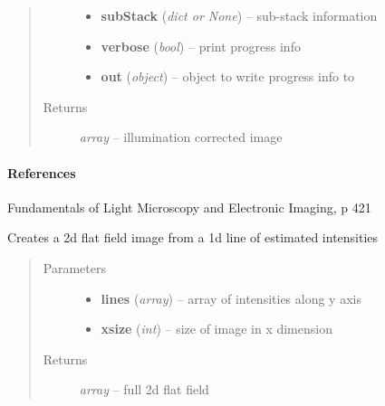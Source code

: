 \documentclass[letterpaper,10pt,english]{sphinxmanual}
\begin{document}
\begin{fulllineitems}
\begin{quote}
\begin{description}
\begin{itemize}
\item {} 
\textbf{subStack} (\emph{dict or None}) --
sub-stack information

\item {} 
\textbf{verbose} (\emph{bool}) --
print progress info

\item {} 
\textbf{out} (\emph{object}) --
object to write progress info to

\end{itemize}

\item[{Returns}] \leavevmode
\emph{array} --
illumination corrected image

\end{description}\end{quote}
\paragraph{References}

Fundamentals of Light Microscopy and Electronic Imaging, p 421




{\hyperref[api/ClearMap.ImageProcessing:ClearMap.ImageProcessing.IlluminationCorrection.DefaultFlatFieldLineFile]{\emph{}}}



\end{fulllineitems}


\begin{fulllineitems}
\label{api/ClearMap.ImageProcessing:ClearMap.ImageProcessing.IlluminationCorrection.flatfieldFromLine}
Creates a 2d flat field image from a 1d line of estimated intensities
\begin{quote}\begin{description}
\item[{Parameters}] \leavevmode\begin{itemize}
\item {} 
\textbf{lines} (\emph{array}) --
array of intensities along y axis

\item {} 
\textbf{xsize} (\emph{int}) --
size of image in x dimension

\end{itemize}

\item[{Returns}] \leavevmode
\emph{array} --
full 2d flat field

\end{description}\end{quote}

\end{fulllineitems}
\end{document}
